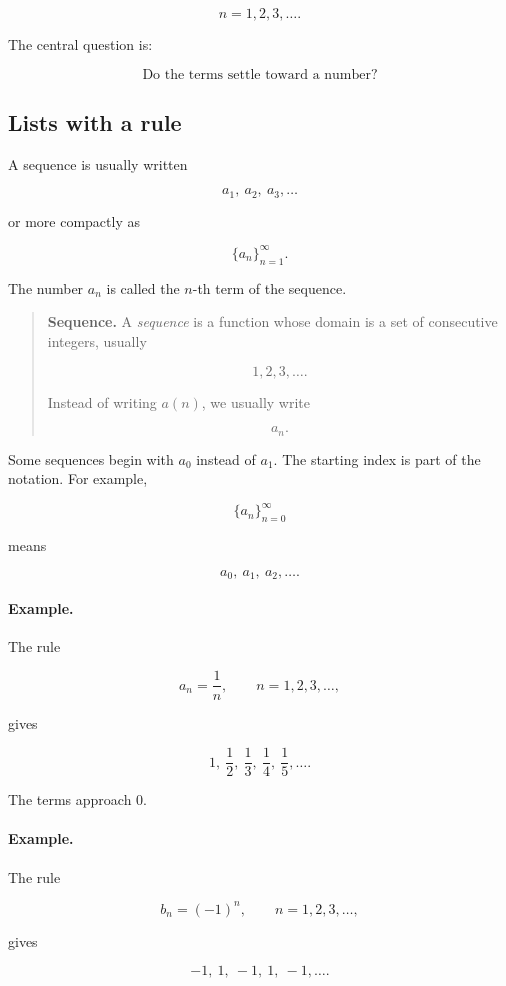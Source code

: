 \[
n=1,2,3,\ldots.
\]

The central question is:

\[
\boxed{
\text{Do the terms settle toward a number?}
}
\]

\subsection{Lists with a rule}
\label{subsec:lists-with-a-rule}

A sequence is usually written

\[
a_1,\ a_2,\ a_3,\ldots
\]

or more compactly as

\[
\{a_n\}_{n=1}^{\infty}.
\]

The number \(a_n\) is called the \(n\)-th term of the sequence.

\begin{quote}
\textbf{Sequence.}
A \emph{sequence} is a function whose domain is a set of consecutive integers, usually

\[
1,2,3,\ldots.
\]

Instead of writing \(a(n)\), we usually write

\[
a_n.
\]
\end{quote}

Some sequences begin with \(a_0\) instead of \(a_1\).  The starting index is part of the
notation.  For example,

\[
\{a_n\}_{n=0}^{\infty}
\]

means

\[
a_0,\ a_1,\ a_2,\ldots.
\]

\paragraph{Example.}
The rule

\[
a_n=\frac1n,
\qquad n=1,2,3,\ldots,
\]

gives

\[
1,\ \frac12,\ \frac13,\ \frac14,\ \frac15,\ldots.
\]

The terms approach \(0\).

\paragraph{Example.}
The rule

\[
b_n=(-1)^n,
\qquad n=1,2,3,\ldots,
\]

gives

\[
-1,\ 1,\ -1,\ 1,\ -1,\ldots.
\]

